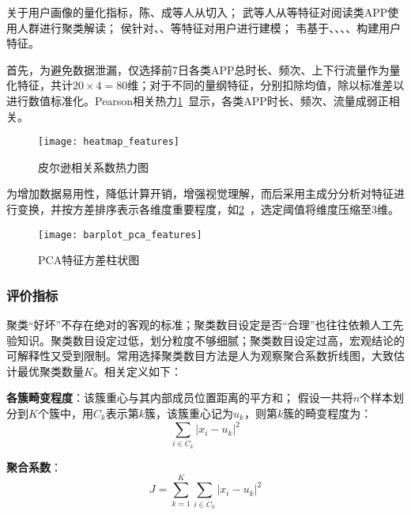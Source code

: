 \documentclass[withoutpreface,bwprint]{cumcmthesis}
\begin{document}
关于用户画像的量化指标，陈\cite{陈纯}、成\cite{成雪}等人从切入；
武\cite{武慧娟}等人从等特征对阅读类APP使用人群进行聚类解读；
侯\cite{侯金凤}针对、、等特征对用户进行建模；
韦\cite{韦磊}基于、、、、构建用户特征。

首先，为避免数据泄漏，仅选择前7日各类APP总时长、频次、上下行流量作为量化特征，共计$20 \times 4=80$维；对于不同的量纲特征，分别扣除均值，除以标准差以进行数值标准化。Pearson相关热力\cref{fig:pearson}~显示，各类APP时长、频次、流量成弱正相关。

\begin{figure}[!htbp]
    \centering
    \texttt{[image: heatmap\_features]}
    \caption{皮尔逊相关系数热力图}
    \label{fig:pearson}
\end{figure}

为增加数据易用性，降低计算开销，增强视觉理解，而后采用主成分分析对特征进行变换，并按方差排序表示各维度重要程度，如\cref{fig:bar-pca}~，选定阈值将维度压缩至$3$维。

\begin{figure}[!htbp]
    \centering
    \texttt{[image: barplot\_pca\_features]}
    \caption{PCA特征方差柱状图}
    \label{fig:bar-pca}
\end{figure}

\subsubsection{评价指标}

聚类“好坏”不存在绝对的客观的标准\cite{机器学习}；聚类数目设定是否“合理”也往往依赖人工先验知识\cite{高维数据的聚类分析}。聚类数目设定过低，划分粒度不够细腻；聚类数目设定过高，宏观结论的可解释性又受到限制。常用选择聚类数目方法是人为观察聚合系数折线图，大致估计最优聚类数量$K$。相关定义如下：

\begin{definition}
    \textbf{各簇畸变程度}：该簇重心与其内部成员位置距离的平方和；
    假设一共将$n$个样本划分到$K$个簇中，用$C_k$表示第$k$簇，该簇重心记为$u_k$，则第$k$簇的畸变程度为：
    \begin{equation}
        \sum_{i\in C_k} |x_i-u_k|^2
        \label{eq:001}
    \end{equation}
    \label{def:001}
\end{definition}

\begin{definition}
    \textbf{聚合系数}：
    \begin{equation}
        J=\sum_{k=1}^{K} \sum_{i \in C_k} |x_i-u_k|^2
        \label{eq:002}
    \end{equation}
    \label{def:002}
\end{definition}
\end{document}
